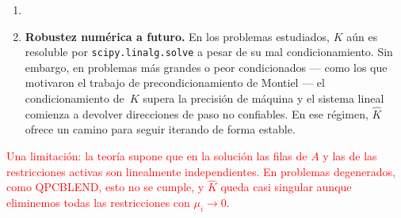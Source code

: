 {\begin{enumerate}
    \item {}

    \item \textbf{Robustez numérica a futuro.} En los problemas estudiados, $K$ aún es resoluble por \texttt{scipy.linalg.solve} a pesar de su mal condicionamiento. Sin embargo, en problemas más grandes o peor condicionados --- como los que motivaron el trabajo de precondicionamiento de Montiel --- el condicionamiento de~$K$ supera la precisión de máquina y el sistema lineal comienza a devolver direcciones de paso no confiables. En ese régimen, $\widehat{K}$ ofrece un camino para seguir iterando de forma estable.
\end{enumerate}

\textcolor{red}{Una limitación: la teoría supone que en la solución las filas de $A$ y las de las restricciones activas son linealmente independientes. En problemas degenerados, como QPCBLEND, esto no se cumple, y $\widehat{K}$ queda casi singular aunque eliminemos todas las restricciones con $\mu_i \to 0$.}
}
